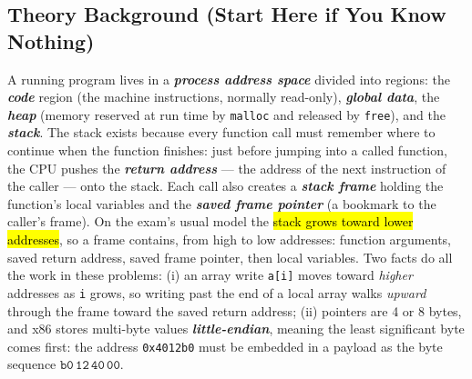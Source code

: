 \documentclass[12pt, a4paper]{article}
\newcommand{\term}[1]{\textbf{\textit{#1}}}        %
\newcommand{\imp}[1]{\hl{#1}}                       %
\begin{document}
\subsection*{Theory Background (Start Here if You Know Nothing)}
A running program lives in a \term{process address space} divided into regions: the \term{code} region (the machine instructions, normally read-only), \term{global data}, the \term{heap} (memory reserved at run time by \texttt{malloc} and released by \texttt{free}), and the \term{stack}. The stack exists because every function call must remember where to continue when the function finishes: just before jumping into a called function, the CPU pushes the \term{return address} --- the address of the next instruction of the caller --- onto the stack. Each call also creates a \term{stack frame} holding the function's local variables and the \term{saved frame pointer} (a bookmark to the caller's frame). On the exam's usual model the \imp{stack grows toward lower addresses}, so a frame contains, from high to low addresses: function arguments, saved return address, saved frame pointer, then local variables. Two facts do all the work in these problems: (i) an array write \texttt{a[i]} moves toward \emph{higher} addresses as \texttt{i} grows, so writing past the end of a local array walks \emph{upward} through the frame toward the saved return address; (ii) pointers are 4 or 8 bytes, and x86 stores multi-byte values \term{little-endian}, meaning the least significant byte comes first: the address \texttt{0x4012b0} must be embedded in a payload as the byte sequence $\texttt{b0}\,\texttt{12}\,\texttt{40}\,\texttt{00}$.
\end{document}
